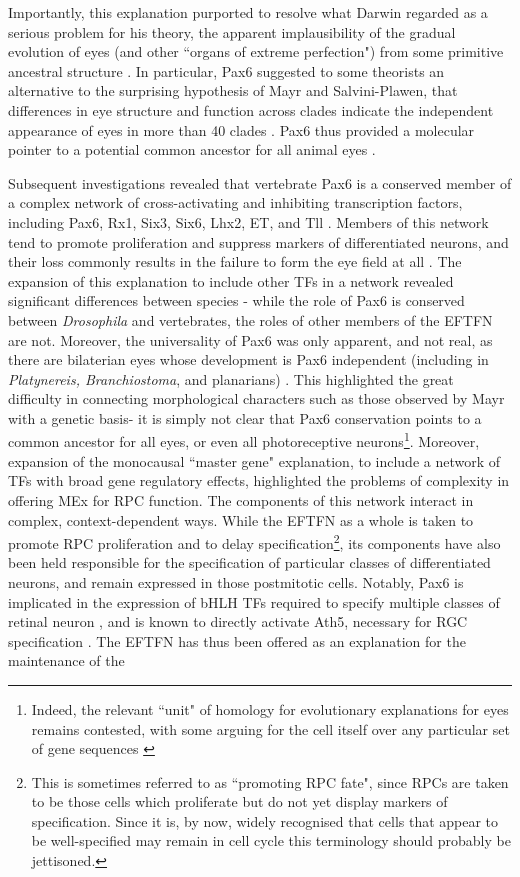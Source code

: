 \documentclass{ut-thesis}
\begin{document}
\begin{NoHyper}
Importantly, this explanation purported to resolve what Darwin regarded as a serious problem for his theory, the apparent implausibility of the gradual evolution of eyes (and other ``organs of extreme perfection") from some primitive ancestral structure \cite[p.143-4]{Darwin1888}. In particular, Pax6 suggested to some theorists an alternative to the surprising hypothesis of Mayr and Salvini-Plawen, that differences in eye structure and function across clades indicate the independent appearance of eyes in more than 40 clades \cite{v.Salvini-Plawen1977}. Pax6 thus provided a molecular pointer to a potential common ancestor for all animal eyes \cite{Erclik2009}.

Subsequent investigations revealed that vertebrate Pax6 is a conserved member of a complex network of cross-activating and inhibiting transcription factors, including Pax6, Rx1, Six3, Six6, Lhx2, ET, and Tll \cite{Zuber2003}. Members of this network tend to promote proliferation and suppress markers of differentiated neurons, and their loss commonly results in the failure to form the eye field at all \cite{Agathocleous2009}. The expansion of this explanation to include other TFs in a network revealed significant differences between species \cite{Wagner2007}- while the role of Pax6 is conserved between \textit{Drosophila} and vertebrates, the roles of other members of the EFTFN are not. Moreover, the universality of Pax6 was only apparent, and not real, as there are bilaterian eyes whose development is Pax6 independent (including in \textit{Platynereis, Branchiostoma}, and planarians) \cite{Kozmik2008}. This highlighted the great difficulty in connecting morphological characters such as those observed by Mayr with a genetic basis- it is simply not clear that Pax6 conservation points to a common ancestor for all eyes, or even all photoreceptive neurons\footnote{Indeed, the relevant ``unit" of homology for evolutionary explanations for eyes remains contested, with some arguing for the cell itself over any particular set of gene sequences \cite{Erclik2009}}. Moreover, expansion of the monocausal ``master gene" explanation, to include a network of TFs with broad gene regulatory effects, highlighted the problems of complexity in offering MEx for RPC function. The components of this network interact in complex, context-dependent ways. While the EFTFN as a whole is taken to promote RPC proliferation and to delay specification\footnote{This is sometimes referred to as ``promoting RPC fate", since RPCs are taken to be those cells which proliferate but do not yet display markers of specification. Since it is, by now, widely recognised that cells that appear to be well-specified may remain in cell cycle \cite{Godinho2007,Engerer2017} this terminology should probably be jettisoned.}, its components have also been held responsible for the specification of particular classes of differentiated neurons, and remain expressed in those postmitotic cells. Notably, Pax6 is implicated in the expression of bHLH TFs required to specify multiple classes of retinal neuron \cite{Marquardt2001}, and is known to directly activate Ath5, necessary for RGC specification \cite{Willardsen2009}. The EFTFN has thus been offered as an explanation for the maintenance of the 
\end{NoHyper}
\end{document}
